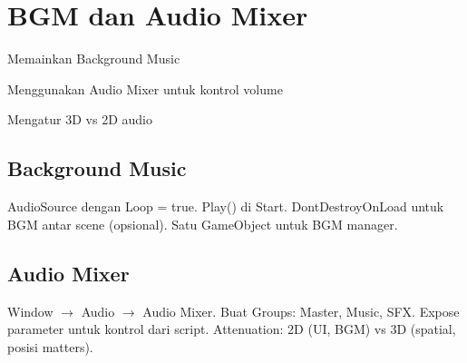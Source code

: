 \section{BGM dan Audio Mixer}

\begin{learningoutcomes}
\item Memainkan Background Music
\item Menggunakan Audio Mixer untuk kontrol volume
\item Mengatur 3D vs 2D audio
\end{learningoutcomes}

\subsection{Background Music}

AudioSource dengan Loop = true. Play() di Start. DontDestroyOnLoad untuk BGM antar scene (opsional). Satu GameObject untuk BGM manager.

\subsection{Audio Mixer}

Window $\rightarrow$ Audio $\rightarrow$ Audio Mixer. Buat Groups: Master, Music, SFX. Expose parameter untuk kontrol dari script. Attenuation: 2D (UI, BGM) vs 3D (spatial, posisi matters).
